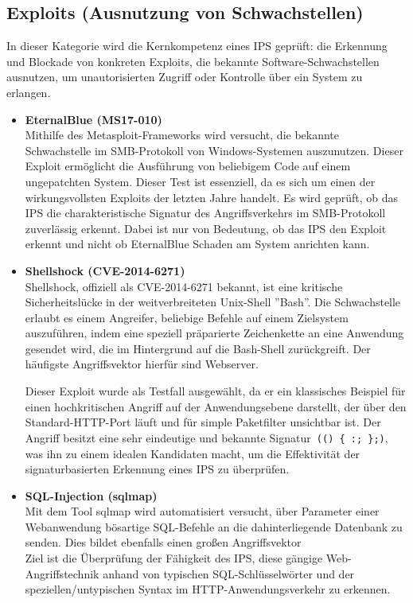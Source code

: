 \subsection{Exploits (Ausnutzung von Schwachstellen)}
In dieser Kategorie wird die Kernkompetenz eines IPS geprüft: die Erkennung und Blockade von konkreten Exploits, die bekannte Software-Schwachstellen ausnutzen, um unautorisierten Zugriff oder Kontrolle über ein System zu erlangen.\\
\begin{itemize}
\item \textbf{EternalBlue (MS17-010)}\\
Mithilfe des Metasploit-Frameworks wird versucht, die bekannte Schwachstelle im SMB-Protokoll von Windows-Systemen auszunutzen. Dieser Exploit ermöglicht die Ausführung von beliebigem Code auf einem ungepatchten System.
Dieser Test ist essenziell, da es sich um einen der wirkungsvollsten Exploits der letzten Jahre handelt. Es wird geprüft, ob das IPS die charakteristische Signatur des Angriffsverkehrs im SMB-Protokoll zuverlässig erkennt. Dabei ist nur von Bedeutung, ob das IPS den Exploit erkennt und nicht ob EternalBlue Schaden am System anrichten kann.\\

\item \textbf{Shellshock (CVE-2014-6271)}\\
Shellshock, offiziell als CVE-2014-6271 bekannt, ist eine kritische Sicherheitslücke in der weitverbreiteten Unix-Shell ''Bash''. Die Schwachstelle erlaubt es einem Angreifer, beliebige Befehle auf einem Zielsystem auszuführen, indem eine speziell präparierte Zeichenkette an eine Anwendung gesendet wird, die im Hintergrund auf die Bash-Shell zurückgreift. Der häufigste Angriffsvektor hierfür sind Webserver.

Dieser Exploit wurde als Testfall ausgewählt, da er ein klassisches Beispiel für einen hochkritischen Angriff auf der Anwendungsebene darstellt, der über den Standard-HTTP-Port läuft und für simple Paketfilter unsichtbar ist. Der Angriff besitzt eine sehr eindeutige und bekannte Signatur\verb| (() { :; };)|, was ihn zu einem idealen Kandidaten macht, um die Effektivität der signaturbasierten Erkennung eines IPS zu überprüfen.\\

\item \textbf{SQL-Injection (sqlmap)}\\
Mit dem Tool sqlmap wird automatisiert versucht, über Parameter einer Webanwendung bösartige SQL-Befehle an die dahinterliegende Datenbank zu senden. Dies bildet ebenfalls einen großen Angriffsvektor\\
Ziel ist die Überprüfung der Fähigkeit des IPS, diese gängige Web-Angriffstechnik anhand von typischen SQL-Schlüsselwörter und der speziellen/untypischen Syntax im HTTP-Anwendungsverkehr zu erkennen.
\end{itemize}

